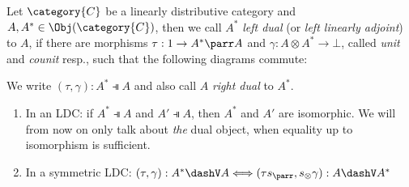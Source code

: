 \documentclass[DIN, pagenumber=false, fontsize=11pt, parskip=half, colorinlistoftodos, svgnames]{scrartcl}
\newcommand{\formatnote}[2][]{\todo[color=cyan!40, #1]{#2}}
\begin{document}
	\begin{definition}
		\label{def: dualObj}
		Let $\category{C} $ be a linearly distributive category and $A, A^* \in \Obj(\category{C}) $, then we call $A^* $ \emph{left dual} (or \emph{left linearly adjoint}) to $A$, if there are morphisms $\tau: 1 \rightarrow A^* \parr A$ and $\gamma: A \otimes A^* \rightarrow \bot $, called \emph{unit} and \emph{counit} resp., such that the following diagrams commute:
		\begin{center}
		\end{center}
		
		We write $(\tau, \gamma): A^* \dashV A $ and also call $A$ \emph{right dual} to $A^*$. 
		
	\end{definition}
	
	\begin{lemma}
		\label{lemma: isoLinDisCat}
		
		\begin{enumerate}
			\item In an LDC: if 
			$A^* \dashV A $ and $A' \dashV A $, 
			then $A^*$ and $A'$ are isomorphic. 
			We will from now on only talk about \emph{the} dual object, when equality up to isomorphism is sufficient.
			\item In a symmetric LDC: 
			$(\tau, \gamma): A^* \dashV A 
			\Longleftrightarrow 
			(\tau s_{\parr}, s_{\otimes} \gamma): A \dashV A^* $ 
		\end{enumerate}
	\end{lemma}
	
\end{document}
